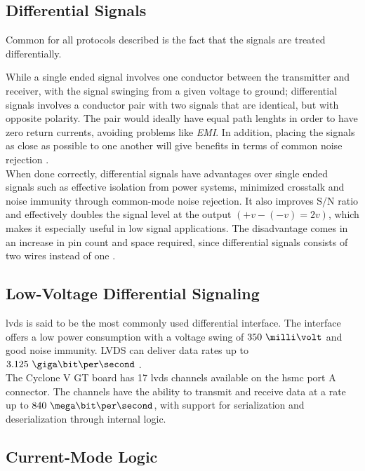 \documentclass[main.tex]{subfiles}
\begin{document}
\subsection{Differential Signals} \label{subsec:diffsig}

Common for all protocols described is the fact that the signals are treated differentially. 

While a single ended signal involves one conductor between the transmitter and receiver, with the signal swinging from a given voltage to ground; differential signals involves a conductor pair with two signals that are identical, but with opposite polarity. The pair would ideally have equal path lenghts in order to have zero return currents, avoiding problems like \textit{EMI}. In addition, placing the signals as close as possible to one another will give benefits in terms of common noise rejection \cite{douglas01}.\\

When done correctly, differential signals have advantages over single ended signals such as effective isolation from power systems, minimized crosstalk and noise immunity through common-mode noise rejection. It also improves S/N ratio and effectively doubles the signal level at the output $(+v - (-v) = 2v)$, which makes it especially useful in low signal applications. The disadvantage comes in an increase in pin count and space required, since differential signals consists of two wires instead of one \cite{douglas01}.


\subsection{Low-Voltage Differential Signaling}

\gls{lvds} is said to be the most commonly used differential interface. The interface offers a low power consumption with a voltage swing of $350\ \milli\volt$ and good noise immunity. LVDS can deliver data rates up to $3.125\ \giga\bit\per\second$ \cite{ti08lvds}.\\

The Cyclone V GT board has 17 \gls{lvds} channels available on the \gls{hsmc} port A connector. The channels have the ability to transmit and receive data at a rate up to $840\ \mega\bit\per\second$, with support for serialization and deserialization through internal logic. \cite{altera_cvoverview15}


\subsection{Current-Mode Logic}
\end{document}
